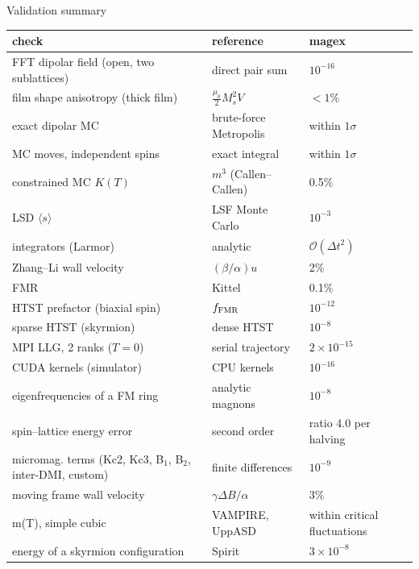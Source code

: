 \begin{frame}{Validation summary}
\centering\scriptsize
\renewcommand{\arraystretch}{1.18}
\begin{tabular}{l l l}
\toprule
check & reference & magex \\
\midrule
FFT dipolar field (open, two sublattices) & direct pair sum & $10^{-16}$ \\
film shape anisotropy (thick film) & $\tfrac{\mu_0}{2}M_s^2V$ & $<1\%$ \\
exact dipolar MC & brute-force Metropolis & within $1\sigma$ \\
MC moves, independent spins & exact integral & within $1\sigma$ \\
constrained MC $K(T)$ & $m^3$ (Callen--Callen) & 0.5\% \\
LSD $\langle s\rangle$ & LSF Monte Carlo & $10^{-3}$ \\
integrators (Larmor) & analytic & $\mathcal O(\Delta t^2)$ \\
Zhang--Li wall velocity & $(\beta/\alpha)u$ & 2\% \\
FMR & Kittel & 0.1\% \\
HTST prefactor (biaxial spin) & $f_{\rm FMR}$ & $10^{-12}$ \\
sparse HTST (skyrmion) & dense HTST & $10^{-8}$ \\
MPI LLG, 2 ranks ($T=0$) & serial trajectory & $2\times10^{-15}$ \\
CUDA kernels (simulator) & CPU kernels & $10^{-16}$ \\
eigenfrequencies of a FM ring & analytic magnons & $10^{-8}$ \\
spin--lattice energy error & second order & ratio 4.0 per halving \\
micromag. terms (Kc2, Kc3, B$_1$, B$_2$, inter-DMI, custom) & finite differences & $10^{-9}$ \\
moving frame wall velocity & $\gamma\Delta B/\alpha$ & 3\% \\
m(T), simple cubic & VAMPIRE, UppASD & within critical fluctuations \\
energy of a skyrmion configuration & Spirit & $3\times10^{-8}$ \\
\bottomrule
\end{tabular}
\end{frame}

